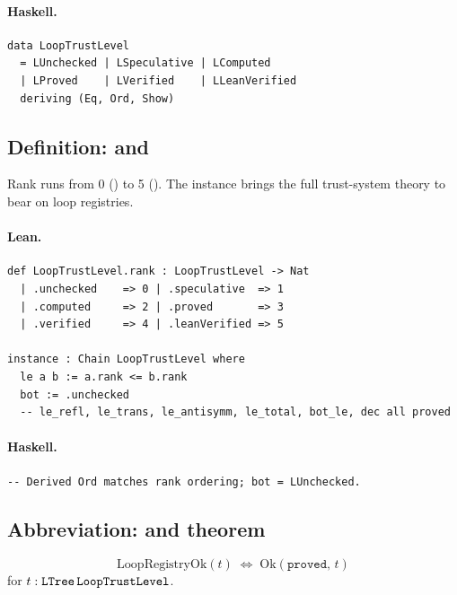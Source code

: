 \documentclass[11pt,a4paper]{article}
\begin{document}
\paragraph{Haskell.}
\begin{lstlisting}[style=haskell]
data LoopTrustLevel
  = LUnchecked | LSpeculative | LComputed
  | LProved    | LVerified    | LLeanVerified
  deriving (Eq, Ord, Show)
\end{lstlisting}


\subsection{Definition:  and }

\begin{defn}
Rank runs from 0 () to 5 ().  The
 instance brings the full trust-system theory to
bear on loop registries.
\end{defn}

\paragraph{Lean.}
\begin{lstlisting}[style=lean]
def LoopTrustLevel.rank : LoopTrustLevel -> Nat
  | .unchecked    => 0 | .speculative  => 1
  | .computed     => 2 | .proved       => 3
  | .verified     => 4 | .leanVerified => 5

instance : Chain LoopTrustLevel where
  le a b := a.rank <= b.rank
  bot := .unchecked
  -- le_refl, le_trans, le_antisymm, le_total, bot_le, dec all proved
\end{lstlisting}

\paragraph{Haskell.}
\begin{lstlisting}[style=haskell]
-- Derived Ord matches rank ordering; bot = LUnchecked.
\end{lstlisting}


\subsection{Abbreviation:  and theorem }

\begin{defn}
\[
  \mathrm{LoopRegistryOk}(t) \;\iff\; \mathrm{Ok}(\mathtt{proved},\, t)
\]
for $t : \texttt{LTree}\,\texttt{LoopTrustLevel}$.
\end{defn}
\end{document}
